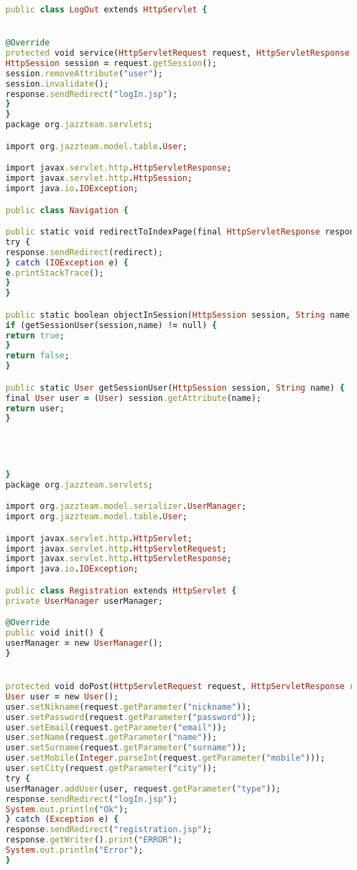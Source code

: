 \begin{lstlisting}[language=Ruby, style=rubystyle]
public class LogOut extends HttpServlet {


@Override
protected void service(HttpServletRequest request, HttpServletResponse response) throws ServletException, IOException {
HttpSession session = request.getSession();
session.removeAttribute("user");
session.invalidate();
response.sendRedirect("logIn.jsp");
}
}
package org.jazzteam.servlets;

import org.jazzteam.model.table.User;

import javax.servlet.http.HttpServletResponse;
import javax.servlet.http.HttpSession;
import java.io.IOException;

public class Navigation {

public static void redirectToIndexPage(final HttpServletResponse response, final String redirect) {
try {
response.sendRedirect(redirect);
} catch (IOException e) {
e.printStackTrace();
}
}

public static boolean objectInSession(HttpSession session, String name) {
if (getSessionUser(session,name) != null) {
return true;
}
return false;
}

public static User getSessionUser(HttpSession session, String name) {
final User user = (User) session.getAttribute(name);
return user;
}




}
package org.jazzteam.servlets;

import org.jazzteam.model.serializer.UserManager;
import org.jazzteam.model.table.User;

import javax.servlet.http.HttpServlet;
import javax.servlet.http.HttpServletRequest;
import javax.servlet.http.HttpServletResponse;
import java.io.IOException;

public class Registration extends HttpServlet {
private UserManager userManager;

@Override
public void init() {
userManager = new UserManager();
}


protected void doPost(HttpServletRequest request, HttpServletResponse response) throws IOException {
User user = new User();
user.setNikname(request.getParameter("nickname"));
user.setPassword(request.getParameter("password"));
user.setEmail(request.getParameter("email"));
user.setName(request.getParameter("name"));
user.setSurname(request.getParameter("surname"));
user.setMobile(Integer.parseInt(request.getParameter("mobile")));
user.setCity(request.getParameter("city"));
try {
userManager.addUser(user, request.getParameter("type"));
response.sendRedirect("logIn.jsp");
System.out.println("Ok");
} catch (Exception e) {
response.sendRedirect("registration.jsp");
response.getWriter().print("ERROR");
System.out.println("Error");
}


\end{lstlisting}
